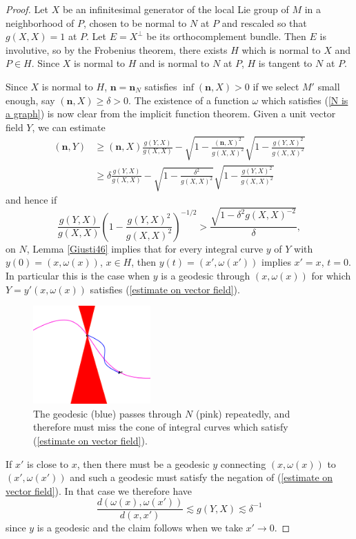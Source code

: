 \documentclass[reqno,12pt,letterpaper]{amsart}
\newcommand{\normal}{\mathbf n}
\theoremstyle{definition}
\numberwithin{equation}{section}
\begin{document}
\begin{proof}
Let $X$ be an infinitesimal generator of the local Lie group of $M$ in a neighborhood of $P$, chosen to be normal to $N$ at $P$ and rescaled so that $g(X, X) = 1$ at $P$.
Let $E = X^\perp$ be its orthocomplement bundle. Then $E$ is involutive, so by the Frobenius theorem, there exists $H$ which is normal to $X$ and $P \in H$.
Since $X$ is normal to $H$ and is normal to $N$ at $P$, $H$ is tangent to $N$ at $P$.

Since $X$ is normal to $H$, $\normal = \normal_N$ satisfies $\inf (\normal, X) > 0$ if we select $M'$ small enough, say $(\normal, X) \geq \delta > 0$.
The existence of a function $\omega$ which satisfies (\ref{N is a graph}) is now clear from the implicit function theorem.
Given a unit vector field $Y$, we can estimate
\begin{align*}
(\normal, Y)
&\geq (\normal, X) \frac{g(Y, X)}{g(X, X)} - \sqrt{1 - \frac{(\normal, X)^2}{g(X, X)^2}}\sqrt{1 - \frac{g(Y, X)^2}{g(X, X)^2}}\\
&\geq \delta \frac{g(Y, X)}{g(X, X)} - \sqrt{1 - \frac{\delta^2}{g(X, X)^2}} \sqrt{1 - \frac{g(Y, X)^2}{g(X, X)^2}}
\end{align*}
and hence if
\begin{equation}\label{estimate on vector field}
\frac{g(Y, X)}{g(X, X)} \left(1 - \frac{g(Y, X)^2}{g(X, X)^2}\right)^{-1/2} > \frac{\sqrt{1 - \delta^2 g(X, X)^{-2}}}{\delta},
\end{equation}
on $N$, Lemma \ref{Giusti46} implies that for every integral curve $y$ of $Y$ with $y(0) = (x, \omega(x))$, $x \in H$, then $y(t) = (x', \omega(x'))$ implies $x' = x$, $t = 0$.
In particular this is the case when $y$ is a geodesic through $(x, \omega(x))$ for which $Y = y'(x, \omega(x))$ satisfies (\ref{estimate on vector field}).

\begin{figure}[h]
\caption{The geodesic (blue) passes through $N$ (pink) repeatedly, and therefore must miss the cone of integral curves which satisfy (\ref{estimate on vector field}).}
\includegraphics[width=0.4\textwidth]{graph_cone}
\end{figure}

If $x'$ is close to $x$, then there must be a geodesic $y$ connecting $(x, \omega(x))$ to $(x', \omega(x'))$ and such a geodesic must satisfy the negation of (\ref{estimate on vector field}).
In that case we therefore have
$$\frac{d(\omega(x), \omega(x'))}{d(x, x')} \lesssim g(Y, X) \lesssim \delta^{-1}$$
since $y$ is a geodesic and the claim follows when we take $x' \to 0$.
\end{proof}
\end{document}
